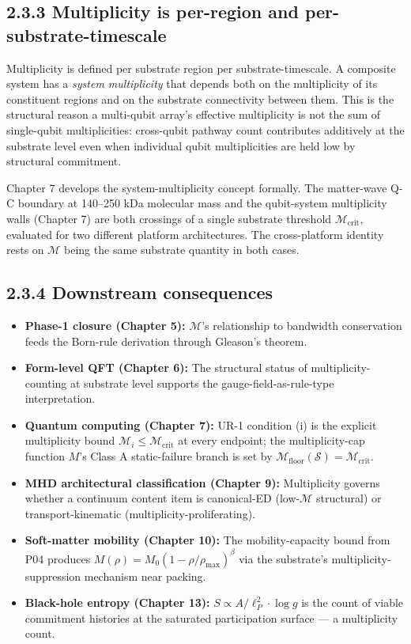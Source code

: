 \documentclass[11pt]{book}
\begin{document}
\subsection{2.3.3 Multiplicity is per-region and per-substrate-timescale}

Multiplicity is defined per substrate region per substrate-timescale. A composite system has a \textit{system multiplicity} that depends both on the multiplicity of its constituent regions and on the substrate connectivity between them. This is the structural reason a multi-qubit array's effective multiplicity is not the sum of single-qubit multiplicities: cross-qubit pathway count contributes additively at the substrate level even when individual qubit multiplicities are held low by structural commitment.

Chapter 7 develops the system-multiplicity concept formally. The matter-wave Q-C boundary at 140–250 kDa molecular mass and the qubit-system multiplicity walls (Chapter 7) are both crossings of a single substrate threshold $\mathcal{M}_\mathrm{crit}$, evaluated for two different platform architectures. The cross-platform identity rests on $\mathcal{M}$ being the same substrate quantity in both cases.

\subsection{2.3.4 Downstream consequences}

\begin{itemize}
\item \textbf{Phase-1 closure (Chapter 5):} $\mathcal{M}$'s relationship to bandwidth conservation feeds the Born-rule derivation through Gleason's theorem.
\item \textbf{Form-level QFT (Chapter 6):} The structural status of multiplicity-counting at substrate level supports the gauge-field-as-rule-type interpretation.
\item \textbf{Quantum computing (Chapter 7):} UR-1 condition (i) is the explicit multiplicity bound $\mathcal{M}_i \leq \mathcal{M}_\mathrm{crit}$ at every endpoint; the multiplicity-cap function $M$'s Class A static-failure branch is set by $\mathcal{M}_\mathrm{floor}(\mathcal{S}) = \mathcal{M}_\mathrm{crit}$.
\item \textbf{MHD architectural classification (Chapter 9):} Multiplicity governs whether a continuum content item is canonical-ED (low-$\mathcal{M}$ structural) or transport-kinematic (multiplicity-proliferating).
\item \textbf{Soft-matter mobility (Chapter 10):} The mobility-capacity bound from P04 produces $M(\rho) = M_0(1-\rho/\rho_\mathrm{max})^\beta$ via the substrate's multiplicity-suppression mechanism near packing.
\item \textbf{Black-hole entropy (Chapter 13):} $S \propto A/\ell_P^2 \cdot \log g$ is the count of viable commitment histories at the saturated participation surface — a multiplicity count.
\end{itemize}
\end{document}
